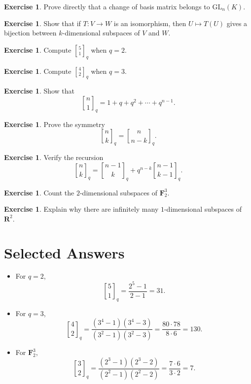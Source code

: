 \documentclass[11pt]{article}
\theoremstyle{definition}
\newtheorem{exercise}[theorem]{Exercise}
\theoremstyle{remark}
\newcommand{\F}{\mathbf{F}}
\newcommand{\R}{\mathbf{R}}
\newcommand{\GL}{\mathrm{GL}}
\newcommand{\qbinom}[2]{\genfrac{[}{]}{0pt}{}{#1}{#2}_q}
\begin{document}
	\begin{exercise}
		Prove directly that a change of basis matrix belongs to \(\GL_n(K)\).
	\end{exercise}
	
	\begin{exercise}
		Show that if \(T:V\to W\) is an isomorphism, then \(U\mapsto T(U)\) gives a bijection between \(k\)-dimensional subspaces of \(V\) and \(W\).
	\end{exercise}
	
	\begin{exercise}
		Compute \(\qbinom{5}{1}\) when \(q=2\).
	\end{exercise}
	
	\begin{exercise}
		Compute \(\qbinom{4}{2}\) when \(q=3\).
	\end{exercise}
	
	\begin{exercise}
		Show that
		\[
		\qbinom{n}{1}=1+q+q^2+\cdots+q^{n-1}.
		\]
	\end{exercise}
	
	\begin{exercise}
		Prove the symmetry
		\[
		\qbinom{n}{k}=\qbinom{n}{n-k}.
		\]
	\end{exercise}
	
	\begin{exercise}
		Verify the recursion
		\[
		\qbinom{n}{k}
		=
		\qbinom{n-1}{k}
		+
		q^{n-k}\qbinom{n-1}{k-1}.
		\]
	\end{exercise}
	
	\begin{exercise}
		Count the \(2\)-dimensional subspaces of \(\F_2^3\).
	\end{exercise}
	
	\begin{exercise}
		Explain why there are infinitely many \(1\)-dimensional subspaces of \(\R^2\).
	\end{exercise}
	
	\section{Selected Answers}
	
	\begin{itemize}
		\item For \(q=2\),
		\[
		\qbinom{5}{1}=\frac{2^5-1}{2-1}=31.
		\]
		
		\item For \(q=3\),
		\[
		\qbinom{4}{2}
		=
		\frac{(3^4-1)(3^4-3)}{(3^2-1)(3^2-3)}
		=
		\frac{80\cdot 78}{8\cdot 6}
		=
		130.
		\]
		
		\item For \(\F_2^3\),
		\[
		\qbinom{3}{2}
		=
		\frac{(2^3-1)(2^3-2)}{(2^2-1)(2^2-2)}
		=
		\frac{7\cdot 6}{3\cdot 2}
		=
		7.
		\]
	\end{itemize}
	
\end{document}
